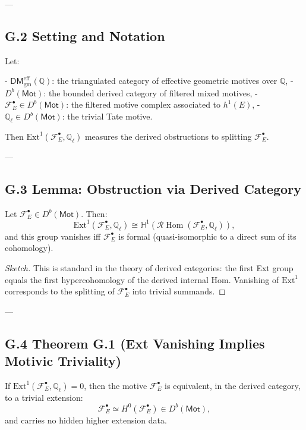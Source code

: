 ---

\subsection*{G.2 Setting and Notation}

Let:

- \( \mathsf{DM}_{\mathrm{gm}}^{\mathrm{eff}}(\mathbb{Q}) \): the triangulated category of effective geometric motives over \( \mathbb{Q} \),
- \( D^b(\mathsf{Mot}) \): the bounded derived category of filtered mixed motives,
- \( \mathcal{F}_E^\bullet \in D^b(\mathsf{Mot}) \): the filtered motive complex associated to \( h^1(E) \),
- \( \mathbb{Q}_\ell \in D^b(\mathsf{Mot}) \): the trivial Tate motive.

Then \( \mathrm{Ext}^1(\mathcal{F}_E^\bullet, \mathbb{Q}_\ell) \) measures the derived obstructions to splitting \( \mathcal{F}_E^\bullet \).

---

\subsection*{G.3 Lemma: Obstruction via Derived Category}

\begin{lemma}
Let \( \mathcal{F}_E^\bullet \in D^b(\mathsf{Mot}) \).  
Then:
\[
\mathrm{Ext}^1(\mathcal{F}_E^\bullet, \mathbb{Q}_\ell) \cong \mathbb{H}^1(\mathcal{R}\!\operatorname{Hom}(\mathcal{F}_E^\bullet, \mathbb{Q}_\ell)),
\]
and this group vanishes iff \( \mathcal{F}_E^\bullet \) is formal (quasi-isomorphic to a direct sum of its cohomology).
\end{lemma}

\begin{proof}[Sketch]
This is standard in the theory of derived categories:  
the first Ext group equals the first hypercohomology of the derived internal Hom.  
Vanishing of \( \mathrm{Ext}^1 \) corresponds to the splitting of \( \mathcal{F}_E^\bullet \) into trivial summands.
\end{proof}

---

\subsection*{G.4 Theorem G.1 (Ext Vanishing Implies Motivic Triviality)}

\begin{theorem}
If \( \mathrm{Ext}^1(\mathcal{F}_E^\bullet, \mathbb{Q}_\ell) = 0 \), then the motive \( \mathcal{F}_E^\bullet \) is equivalent, in the derived category,  
to a trivial extension:
\[
\mathcal{F}_E^\bullet \simeq H^0(\mathcal{F}_E^\bullet) \in D^b(\mathsf{Mot}),
\]
and carries no hidden higher extension data.
\end{theorem}

